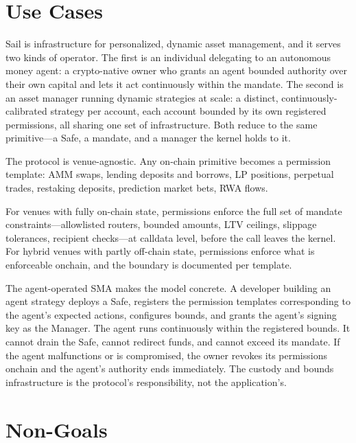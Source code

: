 \documentclass[11pt]{article}
\begin{document}
\section{Use Cases}

Sail is infrastructure for personalized, dynamic asset management, and it serves two kinds of operator. The first is an individual delegating to an autonomous money agent: a crypto-native owner who grants an agent bounded authority over their own capital and lets it act continuously within the mandate. The second is an asset manager running dynamic strategies at scale: a distinct, continuously-calibrated strategy per account, each account bounded by its own registered permissions, all sharing one set of infrastructure. Both reduce to the same primitive---a Safe, a mandate, and a manager the kernel holds to it.

The protocol is venue-agnostic. Any on-chain primitive becomes a permission template: AMM swaps, lending deposits and borrows, LP positions, perpetual trades, restaking deposits, prediction market bets, RWA flows.

For venues with fully on-chain state, permissions enforce the full set of mandate constraints---allowlisted routers, bounded amounts, LTV ceilings, slippage tolerances, recipient checks---at calldata level, before the call leaves the kernel. For hybrid venues with partly off-chain state, permissions enforce what is enforceable onchain, and the boundary is documented per template.

The agent-operated SMA makes the model concrete. A developer building an agent strategy deploys a Safe, registers the permission templates corresponding to the agent's expected actions, configures bounds, and grants the agent's signing key as the Manager. The agent runs continuously within the registered bounds. It cannot drain the Safe, cannot redirect funds, and cannot exceed its mandate. If the agent malfunctions or is compromised, the owner revokes its permissions onchain and the agent's authority ends immediately. The custody and bounds infrastructure is the protocol's responsibility, not the application's.

\section{Non-Goals}
\end{document}
